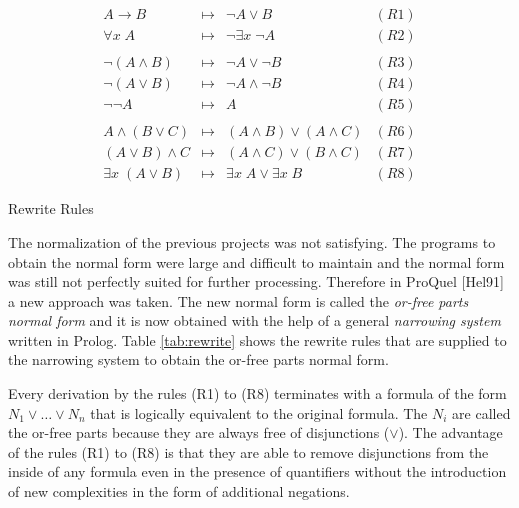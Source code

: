 \begin{table}
\begin{center}
\begin{displaymath}
\begin{array}{llll}
A \rightarrow B & \mapsto & \neg A \vee B & (R1) \\
\forall x\;A & \mapsto & \neg \exists x\;\neg A & (R2) \\
\\
\neg(A \wedge B) & \mapsto & \neg A \vee \neg B & (R3) \\
\neg(A \vee B) & \mapsto & \neg A \wedge \neg B & (R4) \\
\neg \neg A & \mapsto & A & (R5) \\
\\
A \wedge (B \vee C) & \mapsto & (A \wedge B) \vee (A \wedge C) & (R6) \\
(A \vee B) \wedge C & \mapsto & (A \wedge C) \vee (B \wedge C) & (R7) \\
\exists x\;(A \vee B) & \mapsto & \exists x\;A \vee \exists x\;B & (R8)
\end{array}
\end{displaymath}
\end{center}
\caption{Rewrite Rules}
\label{tab:rewrite}
\end{table}

The normalization of the previous projects was not satisfying. The programs to obtain the
normal form were large and difficult to maintain and the normal form was still not perfectly
suited for further processing. Therefore in ProQuel [Hel91] a new approach was taken. 
The new normal form is called the {\em or-free parts normal form} and it is now obtained with 
the help of a general {\em narrowing system} written in Prolog. Table \ref{tab:rewrite} shows the
rewrite rules that are supplied to the narrowing system to obtain the or-free parts normal form.

Every derivation by the rules (R1) to (R8) terminates with a formula of the form $N_1 \vee \ldots 
\vee N_n$ that is logically equivalent to the original formula. The $N_i$ are called the 
or-free parts because they are always free of disjunctions ($\vee$). The advantage of the rules 
(R1) to (R8) is that they are able to remove disjunctions from the inside of any formula even in 
the presence of quantifiers without the introduction of new complexities in the form of additional 
negations.

